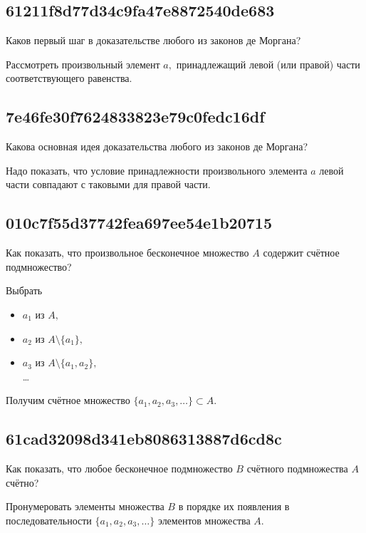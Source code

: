 \documentclass[11pt, a5paper]{article}
\newenvironment{note}[1]{\goodbreak\par\subsection{\hfill \color{lightgray}\tiny #1}}{}
\newenvironment{cloze}[2][\ldots]{\begin{leftbar}}{\end{leftbar}}
\begin{document}
    \begin{note}{61211f8d77d34c9fa47e8872540de683}
        Каков первый шаг в доказательстве любого из законов де Моргана?

        \begin{cloze}{1}
            Рассмотреть произвольный элемент \( a, \) принадлежащий левой (или
            правой) части соответствующего равенства.
        \end{cloze}
    \end{note}


    \begin{note}{7e46fe30f7624833823e79c0fedc16df}
        Какова основная идея доказательства любого из законов де Моргана?

        \begin{cloze}{1}
            Надо показать, что условие принадлежности произвольного элемента \( a \)
            левой части совпадают с таковыми для правой части.
        \end{cloze}
    \end{note}

    \begin{note}{010c7f55d37742fea697ee54e1b20715}
        Как показать, что произвольное бесконечное множество \( A \) содержит
        счётное подмножество?

        \begin{cloze}{1}
            Выбрать
            \begin{itemize}
                \item \( a_1 \) из \( A, \)
                \item \( a_2 \) из \( A \setminus \{ a_1 \}, \)
                \item \( a_3 \) из \( A \setminus \{ a_1, a_2 \}, \) \\
                    \dots
            \end{itemize}
            Получим счётное множество \( \{ a_1, a_2, a_3, \ldots \} \subset A.
            \)
        \end{cloze}
    \end{note}

    \begin{note}{61cad32098d341eb8086313887d6cd8c}
        Как показать, что любое бесконечное подмножество \( B \) счётного
        подмножества \( A \) счётно?

        \begin{cloze}{1}
            Пронумеровать элементы множества \( B \) в порядке их появления в
            последовательности \( \{ a_1, a_2, a_3, \ldots  \} \) элементов
            множества \( A. \)
        \end{cloze}
    \end{note}
\end{document}
